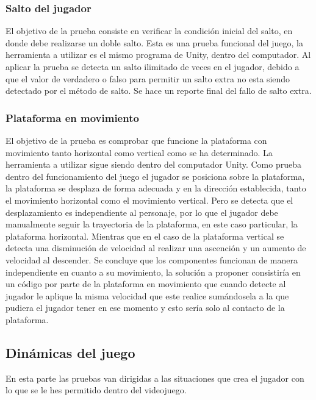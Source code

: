 \subsubsection{Salto del jugador}
El objetivo de la prueba consiste en verificar la condición inicial del salto, en donde debe realizarse un doble salto.
Esta es una prueba funcional del juego, la herramienta a utilizar es el mismo programa de Unity, dentro del computador.
Al aplicar la prueba se detecta un salto ilimitado de veces en el jugador, debido a que el valor de verdadero o falso para permitir un salto extra no esta siendo detectado por el método de salto. Se hace un reporte final del fallo de salto extra.
\subsubsection{Plataforma en movimiento}
El objetivo de la prueba es comprobar que funcione la plataforma con movimiento tanto horizontal como vertical como se ha determinado. La herramienta a utilizar sigue siendo dentro del computador Unity.
Como prueba dentro del funcionamiento del juego el jugador se posiciona sobre la plataforma, la plataforma se desplaza de forma adecuada y en la dirección establecida, tanto el movimiento horizontal como el movimiento vertical. Pero se detecta que el desplazamiento es independiente al personaje, por lo que el jugador debe manualmente seguir la trayectoria de la plataforma, en este caso particular, la plataforma horizontal. Mientras que en el caso de la plataforma vertical se detecta una disminución de velocidad al realizar una ascención y un aumento de velocidad al descender. Se concluye que los componentes funcionan de manera independiente en cuanto a su movimiento, la solución a proponer consistiría en un código por parte de la plataforma en movimiento que cuando detecte al jugador le aplique la misma velocidad que este realice sumándosela a la que pudiera el jugador tener en ese momento y esto sería solo al contacto de la plataforma.

\subsection{Dinámicas del juego}
En esta parte las pruebas van dirigidas a las situaciones que crea el jugador con lo que se le hes permitido dentro del videojuego.
